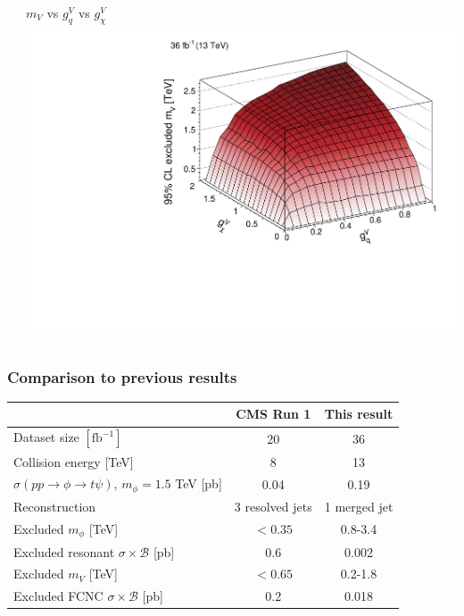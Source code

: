 \documentclass[aspectratio=169,xcolor=dvipsnames,,table,compress]{beamer}
\begin{document}
\begin{frame}[t]
\begin{columns}
\begin{column}{0.33\textwidth}
    \end{column}
    \begin{column}{0.33\textwidth}
      \centering $m_V$ vs $g_q^V$ vs $g_\chi^V$  \\ 
      \includegraphics[width=\textwidth]{../figures/monotop/results/fcnc3d_obs_vector.pdf}
    \end{column}
  \end{columns}
\end{frame}

\begin{frame}[t] \frametitle{Comparison to previous results}
  \centering 
  \vspace{7mm}
  \begin{tabular}{l|c|c} 
    & CMS Run 1 & This result \\ 
    \hline \hline 
    Dataset size $[\mathrm{fb}^{-1}]$ & 20 & 36 \\ 
    Collision energy [TeV] & 8 & 13 \\ 
    $\sigma(pp\rightarrow\phi\rightarrow t\psi)$, $m_\phi = 1.5$ TeV [pb] & 0.04  & 0.19  \\ 
    Reconstruction & 3 resolved jets & 1 merged jet \\  
    \hline
    Excluded $m_\phi$ [TeV] & $<0.35$  & 0.8-3.4  \\ 
    Excluded resonant $\sigma\times \mathcal{B}$ [pb] & 0.6 & 0.002 \\  
    \hline
    Excluded $m_V$ [TeV] & $<0.65$ & 0.2-1.8 \\ 
    Excluded FCNC $\sigma\times \mathcal{B}$ [pb] & 0.2 & 0.018 \\  
  \end{tabular}
\end{frame}
\end{document}
